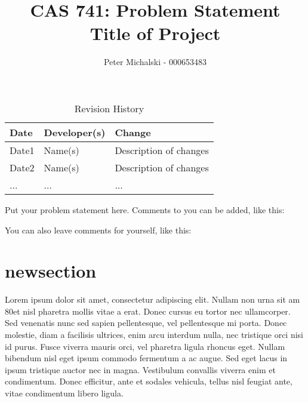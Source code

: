 \documentclass{article}
\title{CAS 741: Problem Statement\\Title of Project}
\author{Peter Michalski - 000653483}
\date{}
\begin{document}
\maketitle

\begin{table}[hp]
\caption{Revision History} \label{TblRevisionHistory}
\begin{tabularx}{\textwidth}{llX}
\toprule
\textbf{Date} & \textbf{Developer(s)} & \textbf{Change}\\
\midrule
Date1 & Name(s) & Description of changes\\
Date2 & Name(s) & Description of changes\\
... & ... & ...\\
\bottomrule
\end{tabularx}
\end{table}


Put your problem statement here.  Comments to you can be added, like this:



You can also leave comments for yourself, like this:

\section{newsection}
Lorem ipsum dolor sit amet, consectetur adipiscing elit. Nullam non urna sit am 80et nisl pharetra mollis vitae a erat. Donec cursus eu tortor nec ullamcorper. Sed venenatis nunc sed sapien pellentesque, vel pellentesque mi porta. Donec molestie, diam a facilisis ultrices, enim arcu interdum nulla, nec tristique orci nisi id purus. Fusce viverra mauris orci, vel pharetra ligula rhoncus eget. Nullam bibendum nisl eget ipsum commodo fermentum a ac augue. Sed eget lacus in ipsum tristique auctor nec in magna. Vestibulum convallis viverra enim et condimentum. Donec efficitur, ante et sodales vehicula, tellus nisl feugiat ante, vitae condimentum libero ligula. 
\end{document}
